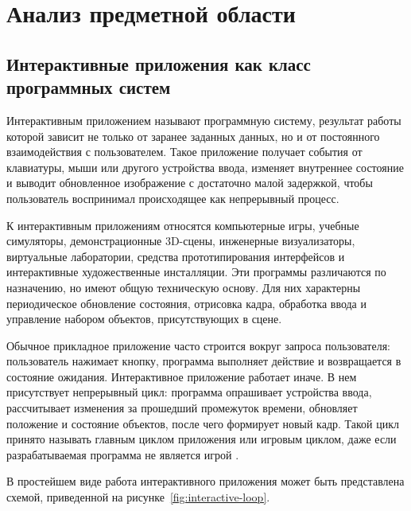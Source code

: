 \section{Анализ предметной области}

\subsection{Интерактивные приложения как класс программных систем}

Интерактивным приложением называют программную систему, результат
работы которой зависит не только от заранее заданных данных, но и от
постоянного взаимодействия с пользователем. Такое приложение получает
события от клавиатуры, мыши или другого устройства ввода, изменяет
внутреннее состояние и выводит обновленное изображение с достаточно малой
задержкой, чтобы пользователь воспринимал происходящее как непрерывный
процесс.

К интерактивным приложениям относятся компьютерные игры, учебные
симуляторы, демонстрационные 3D-сцены, инженерные визуализаторы,
виртуальные лаборатории, средства прототипирования интерфейсов и
интерактивные художественные инсталляции. Эти программы различаются по
назначению, но имеют общую техническую основу. Для них характерны
периодическое обновление состояния, отрисовка кадра, обработка ввода и
управление набором объектов, присутствующих в сцене.

Обычное прикладное приложение часто строится вокруг запроса
пользователя: пользователь нажимает кнопку, программа выполняет действие
и возвращается в состояние ожидания. Интерактивное приложение работает
иначе. В нем присутствует непрерывный цикл: программа опрашивает
устройства ввода, рассчитывает изменения за прошедший промежуток времени,
обновляет положение и состояние объектов, после чего формирует новый кадр.
Такой цикл принято называть главным циклом приложения или игровым
циклом, даже если разрабатываемая программа не является игрой
\cite{gregory-game-engine,nystrom-patterns}.

В простейшем виде работа интерактивного приложения может быть
представлена схемой, приведенной на рисунке~\ref{fig:interactive-loop}.

